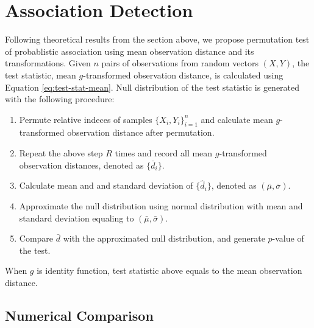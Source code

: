 \documentclass{sig-alternate}
\begin{document}
\section{Association Detection}
\label{sec:comparison}
Following theoretical results from the section above, we propose
permutation test of probablistic association using mean observation
distance and its transformations. Given $n$ pairs of \iid{}
observations from random vectors $(X,Y)$, the test statistic, mean
$g$-transformed observation distance, is calculated using Equation
\ref{eq:test-stat-mean}. Null distribution of the test statistic is
generated with the following procedure:
\begin{enumerate}
\item Permute relative indeces of samples $\{X_i, Y_i\}_{i=1}^n$ and
  calculate mean $g$-transformed observation distance after
  permutation.
\item Repeat the above step $R$ times and record all mean
  $g$-transformed observation distances, denoted as $\{\bar{d}_{i}\}$.
\item Calculate mean and and standard deviation of $\{\hat{d}_{i}\}$,
  denoted as $(\bar{\mu},\bar{\sigma})$.
\item Approximate the null distribution using normal distribution with
  mean and standard deviation equaling to $(\bar{\mu}, \bar{\sigma})$.
\item Compare $\bar{d}$ with the approximated null distribution, and
  generate $p$-value of the test.
\end{enumerate}
When $g$ is identity function, test statistic above equals to the mean
observation distance.

\subsection{Numerical Comparison}
\end{document}
